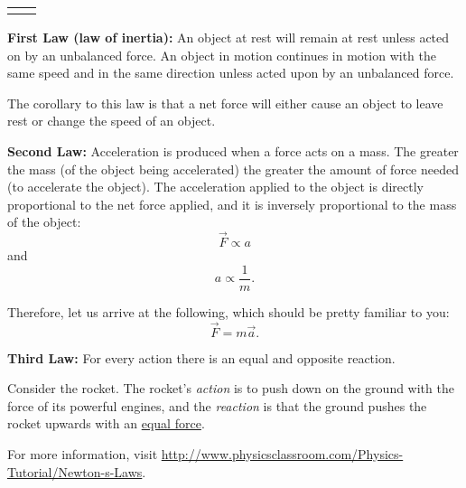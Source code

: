 \begin{longtable}{p{} p{}}
	\tablesubsection{Newton's Laws of Motion}\label{ssec:newtons-laws}
    &\\%
\end{longtable}

\textbf{First Law (law of inertia):}  An object at rest will remain at rest unless acted on by an unbalanced force. An object in motion continues in motion with the same speed and in the same direction unless acted upon by an unbalanced force. 

The corollary to this law is that a net force will either cause an object to leave rest or change the speed of an object.

\textbf{Second Law:} Acceleration is produced when a force acts on a mass. The greater the mass (of the object being accelerated) the greater the amount of force needed (to accelerate the object). The acceleration applied to the object is directly proportional to the net force applied, and it is inversely proportional to the mass of the object: \[ \vec{F} \propto a \] and \[ a \propto \frac{1}{m}. \]

Therefore, let us arrive at the following, which should be pretty familiar to you: \[ \vec{F} = m \vec{a}. \]

\textbf{Third Law:} For every action there is an equal and opposite reaction. 

Consider the rocket. The rocket's {\it action} is to push down on the ground with the force of its powerful engines, and the {\it reaction} is that the ground pushes the rocket upwards with an \underline{equal force}. 

For more information, visit \url{http://www.physicsclassroom.com/Physics-Tutorial/Newton-s-Laws}.
